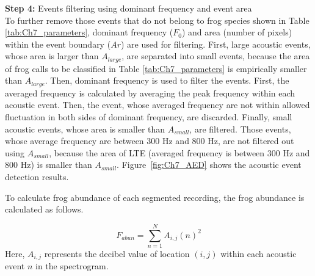 \noindent \textbf{Step 4:} Events filtering using dominant frequency and event area \\
To further remove those events that do not belong to frog species shown in Table \ref{tab:Ch7_parameters}, dominant frequency ($F_{0}$) and area (number of pixels) within the event boundary ($Ar$) are used for filtering. First, large acoustic events, whose area is larger than $A_{large}$, are separated into small events, because the area of frog calls to be classified in Table \ref{tab:Ch7_parameters} is empirically smaller than $A_{large}$. Then, dominant frequency is used to filter the events. First, the averaged frequency is calculated by averaging the peak frequency within each acoustic event. Then, the event, whose averaged frequency are not within allowed fluctuation in both sides of dominant frequency, are  discarded. Finally, small acoustic events, whose area is smaller than $A_{small}$, are filtered. Those events, whose average frequency are between 300 Hz and 800 Hz, are not filtered out using $A_{small}$, because the area of LTE (averaged frequency is between 300 Hz and 800 Hz) is smaller than $A_{small}$. Figure~\ref{fig:Ch7_AED} shows the acoustic event detection results.




To calculate frog abundance of each segmented recording, the frog abundance is calculated as follows.

\begin{equation}
F_{abun} = \sum_{n=1}^{N}A_{i,j}(n)^2
\end{equation}
Here, $A_{i,j}$ represents the decibel value of location $(i,j)$ within each acoustic event $n$ in the spectrogram.

